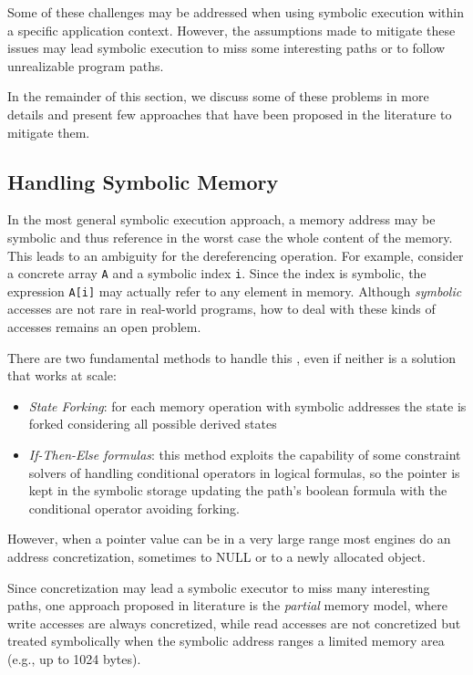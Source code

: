 Some of these challenges may be addressed when using symbolic execution within a specific application context. However, the assumptions made to mitigate these issues may lead symbolic execution to miss some interesting paths or to follow unrealizable program paths.

In the remainder of this section, we discuss some of these problems in more details and present few approaches that have been proposed in the literature to mitigate them.

\subsection{Handling Symbolic Memory}

In the most general symbolic execution approach, a memory address may be symbolic and thus reference in the worst case the whole content of the memory.
This leads to an ambiguity for the dereferencing operation.
For example, consider a concrete array \verb|A| and a symbolic index \verb|i|. Since the index is symbolic, the expression \verb|A[i]| may actually refer to any element in memory. Although {\em symbolic} accesses are not rare in real-world programs, how to deal with these kinds of accesses remains an open problem.

There are two fundamental methods to handle this \cite{King}, even if neither is a solution that works at scale:

\begin{itemize}
\item {\em State Forking}: for each memory operation with symbolic addresses the state is forked considering all possible derived states
\item {\em If-Then-Else formulas}: this method exploits the capability of some constraint solvers of handling conditional operators in logical formulas, so the pointer is kept in the symbolic storage updating the path's boolean formula with the conditional operator avoiding forking.
\end{itemize}

However, when a pointer value can be in a very large range most engines do an address concretization, sometimes to NULL or to a newly allocated object.

Since concretization may lead a symbolic executor to miss many interesting paths, one approach proposed in literature \cite{mayem} is the {\em partial} memory model, where write accesses are always concretized, while read accesses are not concretized but treated symbolically when the symbolic address ranges a limited memory area (e.g., up to 1024 bytes).

